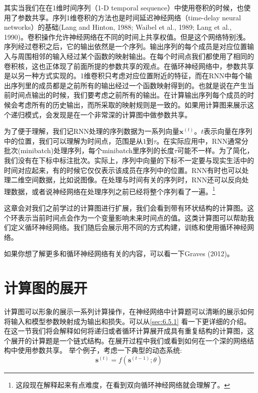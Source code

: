 其实当我们在在1维时间序列（1-D temporal sequence）中使用卷积的时候，也使用了参数共享。序列1维卷积的方法也是时间延迟神经网络（time-delay neural networks）的基础(Lang and Hinton, 1988; Waibel et al., 1989; Lang et al., 1990)。卷积操作允许神经网络在不同的时间上共享权值。但是这个网络特别浅。序列经过卷积之后，它的输出依然是一个序列。输出序列的每个成员是对应位置输入与周围相邻的输入经过某个函数的映射输出。在每个时间点我们都使用了相同的卷积核，这也正体现了前面所提的参数共享的观点。在循环神经网络中，参数共享是以另一种方式实现的。1维卷积只考虑对应位置附近的特征，而在RNN中每个输出序列里的成员都是之前所有的输出经过一个函数映射得到的。也就是说在产生当前时间点输出的时候，我们要考虑之前所有的输出。在计算输出序列每个成员的时候会考虑所有的历史输出，而所采取的映射规则是一致的。如果用计算图来展示这个递归模式，会发现是在一个非常深的计算图中做参数共享。

为了便于理解，我们记RNN处理的序列数据为一系列向量$\bm{x}^{(t)}$。$t$表示向量在序列中的位置，我们可以理解为时间点，范围是从$1$到$\tau$。在实际应用中，RNN通常分批次(minibatch)处理序列，每个minibatch里序列的长度$\tau$可能不一样。为了简化，我们没有在下标中标注批次。实际上，序列中向量的下标不一定要与现实生活中的时间对应起来，有的时候它仅仅表示该成员在序列中的位置。RNN有时也可以处理二维空间数据，比如说图像。在处理与时间有关的序列时，RNN还可以反向处理数据，或者说神经网络在处理序列之前已经将整个序列看了一遍。\footnote{这段现在解释起来有点难度，在看到双向循环神经网络就会理解了。} 

这章会对我们之前学过的计算图进行扩展，我们会看到带有环状结构的计算图。这个环表示当前时间点会作为一个变量影响未来时间点的值。这类计算图可以帮助我们定义循环神经网络。我们随后会展示用不同的方式构建，训练和使用循环神经网络。

如果你想了解更多和循环神经网络有关的内容，可以看一下Graves (2012)。

\section{计算图的展开}
\label{sec:10.1}
计算图可以形象的展示一系列计算操作，在神经网络中计算题可以清晰的展示如何将输入和模型参数映射成为输出和损失。可以从\ref{sec:6.5.1} 看一下更详细的介绍。在这一节我们将会解释如何将递归或者循环计算展开成具有重复结构的计算图，这个展开的计算题是一个链式结构。在展开过程中我们或看到如何在一个深的网络结构中使用参数共享。
举个例子，考虑一下典型的动态系统:
\begin{equation}
\bm{s}^{(t)} = f(\bm{s}^{(t-1)};\theta)
\label{form:10.1}
\end{equation}

